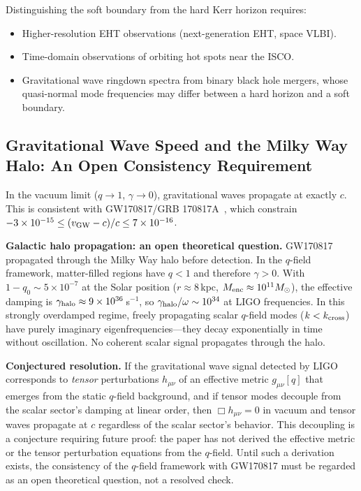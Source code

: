 \documentclass[aps,prd,twocolumn,showpacs,superscriptaddress,preprintnumbers]{revtex4-2}
\begin{document}
Distinguishing the soft boundary from the hard Kerr horizon requires:
\begin{itemize}
    \item Higher-resolution EHT observations (next-generation EHT, space VLBI).
    \item Time-domain observations of orbiting hot spots near the ISCO.
    \item Gravitational wave ringdown spectra from binary black hole mergers, whose quasi-normal mode frequencies may differ between a hard horizon and a soft boundary.
\end{itemize}

\subsection{Gravitational Wave Speed and the Milky Way Halo: An Open Consistency Requirement}
\label{sec:gw170817_halo}

In the vacuum limit ($q\to1$, $\gamma\to0$), gravitational waves propagate at exactly $c$.
This is consistent with GW170817/GRB 170817A~\cite{Abbott:2017apx,GW170817grb}, which constrain $-3\times10^{-15}\leq(v_{\rm GW}-c)/c\leq7\times10^{-16}$.

\textbf{Galactic halo propagation: an open theoretical question.}
GW170817 propagated through the Milky Way halo before detection.
In the $q$-field framework, matter-filled regions have $q<1$ and therefore $\gamma>0$.
With $1-q_0 \sim 5\times10^{-7}$ at the Solar position ($r\approx8$\,kpc, $M_{\rm enc}\approx10^{11}M_\odot$), the effective damping is $\gamma_{\rm halo} \approx 9\times10^{36}$\,s$^{-1}$, so $\gamma_{\rm halo}/\omega \sim 10^{34}$ at LIGO frequencies.
In this strongly overdamped regime, freely propagating scalar $q$-field modes ($k < k_{\rm cross}$) have purely imaginary eigenfrequencies---they decay exponentially in time without oscillation.
No coherent scalar signal propagates through the halo.

\textbf{Conjectured resolution.}
If the gravitational wave signal detected by LIGO corresponds to \emph{tensor} perturbations $h_{\mu\nu}$ of an effective metric $g_{\mu\nu}[q]$ that emerges from the static $q$-field background, and if tensor modes decouple from the scalar sector's damping at linear order, then $\Box h_{\mu\nu}=0$ in vacuum and tensor waves propagate at $c$ regardless of the scalar sector's behavior.
This decoupling is a conjecture requiring future proof: the paper has not derived the effective metric or the tensor perturbation equations from the $q$-field.
Until such a derivation exists, the consistency of the $q$-field framework with GW170817 must be regarded as an open theoretical question, not a resolved check.
\end{document}
